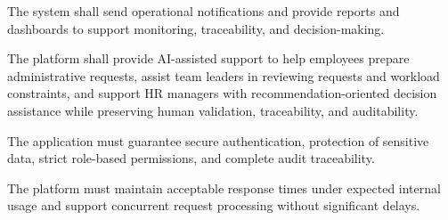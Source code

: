 
  {\fontsize{12}{18}\selectfont
  \setlength{\parindent}{1.2cm}
  \setlength{\parskip}{6pt}

  \indent The system shall send operational notifications and provide reports and dashboards to support monitoring, traceability, and decision-making.

  }

  \vspace{6pt}


  {\fontsize{12}{18}\selectfont
  \setlength{\parindent}{1.2cm}
  \setlength{\parskip}{6pt}

  \indent The platform shall provide AI-assisted support to help employees prepare administrative requests, assist team leaders in reviewing requests and workload constraints, and support HR managers with recommendation-oriented decision assistance while preserving human validation, traceability, and auditability.

  }

  \vspace{6pt}



  {\fontsize{12}{18}\selectfont
  \setlength{\parindent}{1.2cm}
  \setlength{\parskip}{6pt}

  \indent The application must guarantee secure authentication, protection of sensitive data, strict role-based permissions, and complete audit traceability.

  }

  \vspace{6pt}


  {\fontsize{12}{18}\selectfont
  \setlength{\parindent}{1.2cm}
  \setlength{\parskip}{6pt}

  \indent The platform must maintain acceptable response times under expected internal usage and support concurrent request processing without significant delays.

  }

